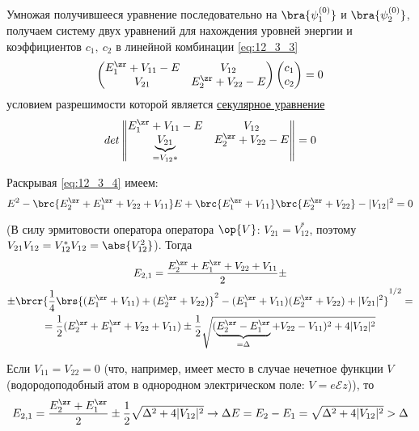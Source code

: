 Умножая получившееся уравнение последовательно на $\bra{\psi_1^{(0)}}$ и $\bra{\psi_2^{(0)}}$, получаем систему двух уравнений для нахождения уровней энергии и коэффициентов $c_1,~c_2$ в линейной комбинации \eqref{eq:12_3_3}
\begin{gather*}
  \begin{matrix}
    \begin{pmatrix}
      E_1^\zr + V_{11} - E & V_{12} \\
      V_{21} & E_2^\zr + V_{22} - E
    \end{pmatrix} 
    \begin{pmatrix}
      c_1\\
      c_2
    \end{pmatrix} 
     = 0
  \end{matrix}
\end{gather*}
условием разрешимости которой является \underline{секулярное уравнение}
\begin{equation}
\label{eq:12_3_4}
det \left \| \begin{matrix}
E_1^\zr + V_{11} - E & V_{12} \\ 
\underbrace{V_{21}}_{=V_{12}*} & E_2^\zr + V_{22} - E
\end{matrix}
\right \| = 0
\end{equation}

Раскрывая \eqref{eq:12_3_4} имеем:
$$
E^2 - \brc{E_2^\zr + E_1^\zr + V_{22} + V_{11}}E + \brc{E_1^\zr + V_{11}} \brc{E_2^\zr + V_{22}} - |V_{12}|^2 = 0
$$

(В силу эрмитовости оператора оператора $\op{V}$: $V_{21} = V_{12}^*$, поэтому ${V_{21}V_{12} = V_{12}^* V_{12} = \abs{V_{12}^2}}$). Тогда
\begin{gather*}
E_{2, 1} = \frac{E_2^\zr + E_1^\zr + V_{22} + V_{11}}{2} \pm\\
\pm  \brcr{\frac{1}{4} \brs{ (E_1^\zr + V_{11}) + (E_2^\zr + V_{22}) }^2  - (E_1^\zr + V_{11})(E_2^\zr + V_{22}) + |V_{21}|^2 }^{1/2} = \\
= \frac{1}{2}(E_2^\zr + E_1^\zr + V_{22} + V_{11}) \pm \frac{1}{2} \sqrt{(\underbrace{E_2^\zr -E_1^\zr}_{=\Delta} + V_{22} - V_{11})^2 + 4 |V_{12}|^2}
\end{gather*}

Если $V_{11} = V_{22} = 0$ (что, например, имеет место в случае нечетное функции $V$ (водородоподобный атом в однородном электрическом поле: $V = e \mathcal{E} z$)), то 
$$
E_{2, 1}=\frac{E_2^\zr + E_1^\zr}{2} \pm \frac{1}{2} \sqrt{\Delta^2 + 4 |V_{12}|^2} \to \Delta E = E_2 - E_1 = \sqrt{\Delta^2 + 4 |V_{12}|^2} > \Delta
$$

